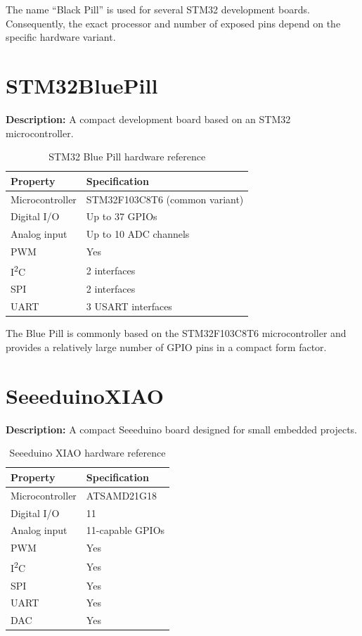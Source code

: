 The name ``Black Pill'' is used for several STM32 development boards.
Consequently, the exact processor and number of exposed pins depend on the
specific hardware variant.

\newpage
\section{STM32BluePill}

\textbf{Description:} A compact development board based on an STM32
microcontroller.

\begin{table}[H]
\centering
\caption{STM32 Blue Pill hardware reference}
\label{tab:board-blue-pill}
\begin{tabular}{ll}
\toprule
\textbf{Property} & \textbf{Specification} \\
\midrule
Microcontroller & STM32F103C8T6 (common variant) \\
Digital I/O & Up to 37 GPIOs \\
Analog input & Up to 10 ADC channels \\
PWM & Yes \\
I\textsuperscript{2}C & 2 interfaces \\
SPI & 2 interfaces \\
UART & 3 USART interfaces \\
\bottomrule
\end{tabular}
\end{table}

The Blue Pill is commonly based on the STM32F103C8T6 microcontroller and
provides a relatively large number of GPIO pins in a compact form factor.

\section{SeeeduinoXIAO}

\textbf{Description:} A compact Seeeduino board designed for small
embedded projects.

\begin{table}[H]
\centering
\caption{Seeeduino XIAO hardware reference}
\label{tab:board-xiao}
\begin{tabular}{ll}
\toprule
\textbf{Property} & \textbf{Specification} \\
\midrule
Microcontroller & ATSAMD21G18 \\
Digital I/O & 11 \\
Analog input & 11-capable GPIOs \\
PWM & Yes \\
I\textsuperscript{2}C & Yes \\
SPI & Yes \\
UART & Yes \\
DAC & Yes \\
\bottomrule
\end{tabular}
\end{table}

